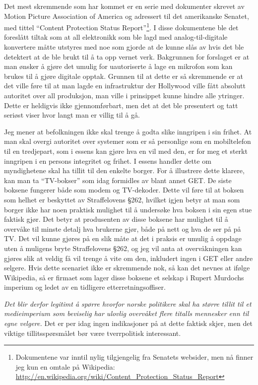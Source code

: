 \documentclass[11pt,norsk,a4paper]{article}
\begin{document}
Det mest skremmende som har kommet er en serie med dokumenter skrevet
av Motion Picture Association of America og adressert til det
amerikanske Senatet, med tittel ``Content Protection Status
Report''\footnote{Dokumentene var inntil nylig tilgjengelig fra
  Senatets websider, men nå finner jeg kun en omtale på Wikipedia:
  \url{http://en.wikipedia.org/wiki/Content_Protection_Status_Report}}.
I disse dokumentene ble det foreslått tiltak som at all elektronikk
som ble lagd med analog-til-digitale konvertere måtte utstyres med noe
som gjorde at de kunne slås av hvis det ble detektert at de ble brukt
til å ta opp vernet verk. Bakgrunnen for forslaget er at man ønsker å
gjøre det umulig for uautoriserte å lage en mikrofon som kan brukes
til å gjøre digitale opptak. Grunnen til at dette er så skremmende er at
det ville føre til at man lagde en infrastruktur der Hollywood ville
fått absolutt autoritet over all produksjon, man ville i prinsippet
kunne hindre alle ytringer. Dette er heldigvis ikke
gjennomførbart, men det at det ble presentert og tatt seriøst viser
hvor langt man er villig til å gå. 

Jeg mener at befolkningen ikke skal trenge å godta slike inngripen i
sin frihet. At man skal overgi autoritet over systemer som er så
personlige som en mobiltelefon til en tredjepart, som i essens kan
gjøre hva en vil med den, er for meg et sterkt inngripen i en persons
integritet og frihet. I essens handler dette om myndighetene skal ha
tillit til den enkelte borger. For å illustrere dette klarere, kan man
ta ``TV-bokser'' som idag formidles av blant annet GET. De siste
boksene fungerer både som modem og TV-dekoder. Dette vil føre til at
boksen som helhet er beskyttet av Straffelovens §262, hvilket igjen
betyr at man som borger ikke har noen praktisk mulighet til å
undersøke hva boksen i sin egen stue faktisk gjør. Det betyr at
produsenten av disse boksene har mulighet til å overvåke til minste
detalj hva brukerne gjør, både på nett og hva de ser på på TV. Det vil
kunne gjøres på en slik måte at det i praksis er umulig å oppdage uten
å muligens bryte Straffelovens §262, og jeg vil anta at overvåkningen
kan gjøres slik at veldig få vil trenge å vite om den, inkludert ingen
i GET eller andre selgere. Hvis dette scenariet ikke er skremmende
nok, så kan det nevnes at ifølge Wikipedia\cite{ndswiki}, så er firmaet som lager
disse boksene et selskap i Rupert Murdochs imperium og ledet av en
tidligere etterretningsoffiser.

\emph{Det blir derfor legitimt å spørre hvorfor norske politikere skal ha
større tillit til et medieimperium som beviselig har ulovlig overvåket
flere titalls mennesker\cite{newscorpphone} enn til egne velgere.} Det er per idag ingen
indikasjoner på at dette faktisk skjer, men det viktige
tillitsspørsmålet bør være tverrpolitisk interessant. 
\end{document}
